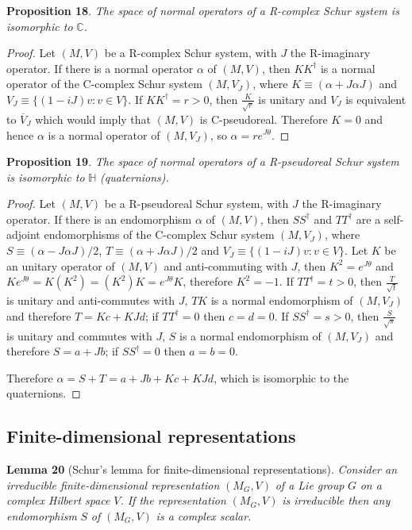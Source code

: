\documentclass[11pt]{book}
\begin{document}
\textbf{Proposition 18}. \emph{The space of normal operators of a
R-complex Schur system is isomorphic to }\(\mathbb{C}\)\emph{.}

\emph{Proof.} Let \((M,V)\) be a R-complex Schur system, with \(J\) the
R-imaginary operator. If there is a normal operator \(\alpha\) of
\((M,V)\), then \(KK^\dagger\) is a normal operator of the C-complex
Schur system \((M,V_{J})\), where \(K\equiv
(\alpha+J\alpha J)\) and \(V_{J}\equiv \{(1-iJ) v: v\in V\}\). If
\(KK^\dagger=r>0\), then \(\frac{K}{\sqrt{r}}\) is unitary and \(V_J\)
is equivalent to \(\overline{V}_{J}\) which would imply that \((M,V)\)
is C-pseudoreal. Therefore \(K=0\) and hence \(\alpha\) is a normal
operator of \((M,V_{J})\), so \(\alpha=r e^{J\theta}\).~◻

\textbf{Proposition 19}. \emph{The space of normal operators of a
R-pseudoreal Schur system is isomorphic to }\(\mathbb{H}\)\emph{
(quaternions).}

\emph{Proof.} Let \((M,V)\) be a R-pseudoreal Schur system, with \(J\)
the R-imaginary operator. If there is an endomorphism \(\alpha\) of
\((M,V)\), then \(SS^\dagger\) and \(TT^\dagger\) are a self-adjoint
endomorphisms of the C-complex Schur system \((M,V_{J})\), where
\(S\equiv(\alpha-J\alpha J)/2\), \(T\equiv(\alpha+J\alpha J)/2\) and
\(V_{J}\equiv\{(1-iJ) v: v\in V\}\). Let \(K\) be an unitary operator of
\((M,V)\) and anti-commuting with \(J\), then \(K^2=e^{J\theta}\) and
\(Ke^{J\theta}=K(K^2)=(K^2)K=e^{J\theta}K\), therefore \(K^2=-1\). If
\(TT^\dagger=t>0\), then \(\frac{T}{\sqrt{t}}\) is unitary and
anti-commutes with \(J\), \(TK\) is a normal endomorphism of
\((M,V_{J})\) and therefore \(T=Kc+KJd\); if \(TT^\dagger=0\) then
\(c=d=0\). If \(SS^\dagger=s>0\), then \(\frac{S}{\sqrt{s}}\) is unitary
and commutes with \(J\), \(S\) is a normal endomorphism of \((M,V_{J})\)
and therefore \(S=a+Jb\); if \(SS^\dagger=0\) then \(a=b=0\).

Therefore \(\alpha=S+T=a+Jb+Kc+KJd\), which is isomorphic to the
quaternions.~◻

\hypertarget{section:Finite}{%
\subsection{Finite-dimensional representations}\label{section:Finite}}

\textbf{Lemma 20} (Schur's lemma for finite-dimensional
representations\cite{Ramakrishnan1999Fourier}). \emph{Consider an irreducible finite-dimensional
representation }\((M_G,V)\)\emph{ of a Lie group }\(G\)\emph{ on a
complex Hilbert space }\(V\)\emph{. If the representation
}\((M_G,V)\)\emph{ is irreducible then any endomorphism }\(S\)\emph{ of
}\((M_G,V)\)\emph{ is a complex scalar.}
\end{document}
